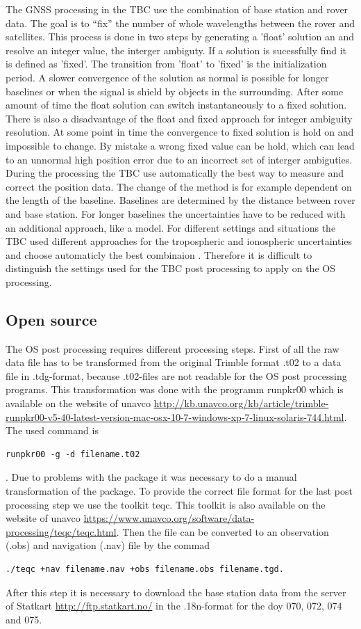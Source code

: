The GNSS processing in the TBC use the combination of base station and rover data.
The goal is to “fix” the number of whole wavelengths between the rover and satellites.
This process is done in two steps by generating a 'float' solution an and resolve an integer value, the interger ambiguty. 
If a solution is sucessfully find it is defined as 'fixed'.
The transition from 'float' to 'fixed' is the initialization period.
A slower convergence of the solution as normal is possible for longer baselines or when the signal is shield by objects in the surrounding.
After some amount of time the float solution can switch instantaneously to a fixed solution.
There is also a disadvantage of the float and fixed approach for integer ambiguity resolution.
At some point in time the convergence to fixed solution is hold on and impossible to change.
By mistake a wrong fixed value can be hold, which can lead to an unnormal high position error due to an incorrect set of interger ambiguties.
During the processing the TBC use automatically the best way to measure and correct the position data. 
The change of the method is for example dependent on the length of the baseline.
Baselines are determined by the distance between rover and base station.
For longer baselines the uncertainties have to be reduced with an additional approach, like a model.
For different settings and situations the TBC used different approaches for the tropospheric and ionospheric uncertainties and choose automaticly the best combinaion \citep{Trprocess}.
Therefore it is difficult to distinguish the settings used for the TBC post processing to apply on the OS processing.

\subsection{Open source}
The OS post processing requires different processing steps.
First of all the raw data file has to be transformed from the original Trimble format .t02 to a data file in .tdg-format, because .t02-files are not readable for the OS post processing programs.
This transformation was done with the programm runpkr00 which is available on the website of unavco \url{http://kb.unavco.org/kb/article/trimble-runpkr00-v5-40-latest-version-mac-osx-10-7-windows-xp-7-linux-solaris-744.html}.
The used command is 
\begin{verbatim} 
runpkr00 -g -d filename.t02 
\end{verbatim}.
Due to problems with the package it was necessary to do a manual transformation of the package.
To provide the correct file format for the last post processing step we use the toolkit teqc.
This toolkit is also available on the website of unavco \url{https://www.unavco.org/software/data-processing/teqc/teqc.html}.
Then the file can be converted to an observation (.obs) and navigation (.nav) file by the commad
\begin{verbatim}
./teqc +nav filename.nav +obs filename.obs filename.tgd.
\end{verbatim} 
After this step it is necessary to download the base station data from the server of Statkart \url{http://ftp.statkart.no/} in the .18n-format for the doy 070, 072, 074 and 075.
\medskip

